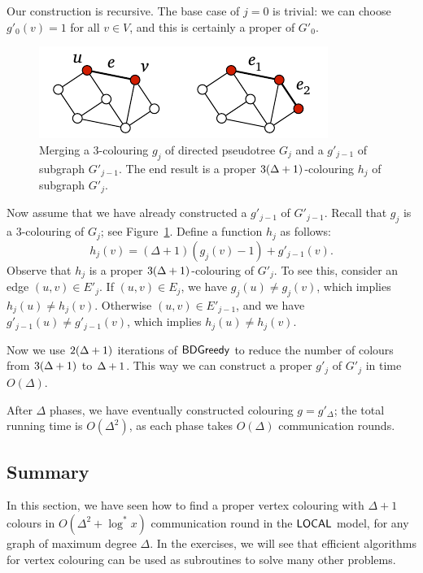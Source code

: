 Our construction is recursive. The base case of $j = 0$ is trivial: we can choose $g'_0(v) = 1$ for all $v \in V$, and this is certainly a proper \Dpocol{} of $G'_0$.

\begin{figure}
    \centering
    \includegraphics[page=\PMergeColours]{figs.pdf}
    \caption{Merging a $3$-colouring $g_j$ of directed pseudotree $G_j$ and a \Dpocol{} $g'_{j-1}$ of subgraph $G'_{j-1}$. The end result is a proper $3(\Delta\nobreak +1)$-colouring $h_j$ of subgraph $G'_j$.}\label{fig:merge-colours}
\end{figure}

Now assume that we have already constructed a \Dpocol{} $g'_{j-1}$ of $G'_{j-1}$. Recall that $g_j$ is a $3$-colouring of $G_j$; see Figure~\ref{fig:merge-colours}. Define a function $h_j$ as follows:
\[
    h_j(v) = (\Delta+1) (g_j(v)-1) + g'_{j-1}(v).
\]
Observe that $h_j$ is a proper $3(\Delta+\nobreak 1)$-colouring of $G'_j$. To see this, consider an edge $(u,v) \in E'_j$. If $(u,v) \in E_j$, we have $g_j(u) \ne g_j(v)$, which implies $h_j(u) \ne h_j(v)$. Otherwise $(u,v) \in E'_{j-1}$, and we have $g'_{j-1}(u) \ne g'_{j-1}(v)$, which implies $h_j(u) \ne h_j(v)$.

Now we use $2(\Delta+\nobreak 1)$ iterations of $\textsf{BDGreedy}$ to reduce the number of colours from $3(\Delta+\nobreak 1)$ to $\Delta+\nobreak 1$. This way we can construct a proper \Dpocol{} $g'_j$ of $G'_j$ in time $O(\Delta)$.

After $\Delta$ phases, we have eventually constructed colouring $g = g'_\Delta$; the total running time is $O(\Delta^2)$, as each phase takes $O(\Delta)$ communication rounds.


\subsection{Summary}

In this section, we have seen how to find a proper vertex colouring with $\Delta+1$ colours in $O(\Delta^2 + \log^* x)$ communication round in the $\textsf{LOCAL}$ model, for any graph of maximum degree $\Delta$. In the exercises, we will see that efficient algorithms for vertex colouring can be used as subroutines to solve many other problems.


